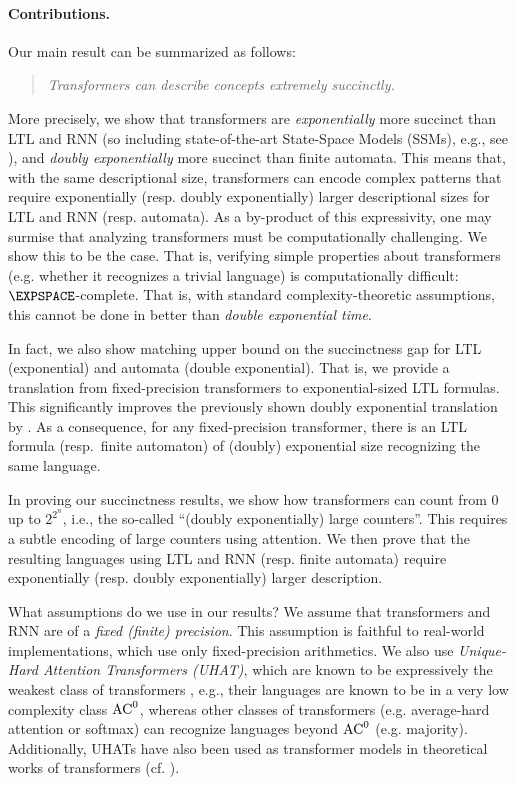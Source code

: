 
\paragraph{Contributions.} Our main result can be summarized as follows: 
\begin{quotation}
\emph{Transformers can describe concepts extremely succinctly.}
\end{quotation}
More precisely, we show that transformers are \emph{exponentially} more succinct than
LTL and RNN (so including state-of-the-art State-Space Models (SSMs), e.g., see
\citep{mamba,ssm-will}), and \emph{doubly exponentially} more succinct than finite automata. 
This means that, with the same descriptional size, transformers can encode
complex patterns that require exponentially (resp. doubly exponentially) larger 
descriptional sizes for LTL and RNN (resp. automata). 
As a by-product of this expressivity, one may surmise that analyzing
transformers must be computationally challenging. We show this to be the case.
That is, verifying simple properties about transformers (e.g. whether it 
recognizes a trivial language) is computationally difficult: $\EXPSPACE$-complete. 
That is, with standard complexity-theoretic assumptions, this cannot be done
in better than \emph{double exponential time}. 

In fact, we also show matching upper bound on the succinctness gap for LTL
(exponential) and automata (double exponential). %
That is, we provide a translation from fixed-precision transformers to
exponential-sized LTL formulas. %
This significantly improves the previously shown doubly exponential translation by \cite{YangCA24}.
As a consequence, for any fixed-precision transformer, there is an LTL formula 
(resp.\ finite automaton) of (doubly) exponential size recognizing the same 
language. %

In proving our succinctness results, we show how transformers can count from
0 up to $2^{2^n}$, i.e., the so-called ``(doubly exponentially) large 
counters''. This
requires a subtle encoding of large counters using attention. We then prove that
the resulting languages using LTL and RNN (resp. finite automata) require
exponentially (resp. doubly exponentially) larger description.

What assumptions do we use in our results? We assume that transformers
and RNN are of a \emph{fixed (finite) precision}. This assumption is faithful to 
real-world implementations, which use only fixed-precision arithmetics. 
We also use \emph{Unique-Hard Attention Transformers (UHAT)}, which are known 
to be expressively the weakest class of transformers \citep{Hao22}, e.g., their 
languages are
known to be in a very low complexity class $\text{AC}^0$, whereas other classes of
transformers (e.g. average-hard attention or softmax) can recognize languages
beyond $\text{AC}^0$ (e.g. majority). Additionally, UHATs have also been used as
transformer models in theoretical works of transformers (cf.
\citep{YangCA24,tale,transformers_survey,Hao22,LC25,hahn20,barcelo2024logical,uhat-data}). 

